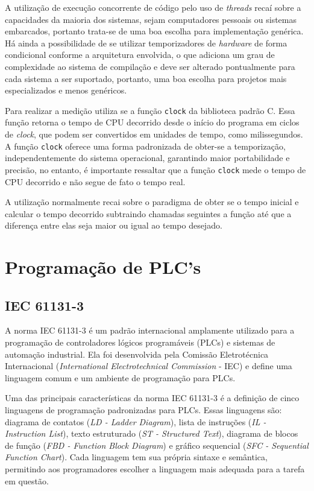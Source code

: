 A utilização de execução concorrente de código pelo uso de \textit{threads} recaí sobre a capacidades da maioria dos sistemas, sejam computadores pessoais ou sistemas embarcados, portanto trata-se de uma boa escolha para implementação genérica. Há ainda a possibilidade de se utilizar temporizadores de \textit{hardware} de forma condicional conforme a arquitetura envolvida, o que adiciona um grau de complexidade ao sistema de compilação e deve ser alterado pontualmente para cada sistema a ser suportado, portanto, uma boa escolha para projetos mais especializados e menos genéricos.

Para realizar a medição utiliza se a função \lstinline{clock} da biblioteca padrão C. Essa função retorna o tempo de CPU decorrido desde o início do programa em ciclos de \textit{clock}, que podem ser convertidos em unidades de tempo, como milissegundos. A função \lstinline{clock} oferece uma forma padronizada de obter-se a temporização, independentemente do sistema operacional, garantindo maior portabilidade e precisão, no entanto, é importante ressaltar que a função \lstinline{clock} mede o tempo de CPU decorrido e não segue de fato o tempo real.

A utilização normalmente recai sobre o paradigma de obter se o tempo inicial e calcular o tempo decorrido subtraindo chamadas seguintes a função até que a diferença entre elas seja maior ou igual ao tempo desejado. 



\section{Programação de PLC's}

\subsection{IEC 61131-3}

A norma IEC 61131-3 \cite{IEC611313} é um padrão internacional amplamente utilizado para a programação de controladores lógicos programáveis (PLCs) e sistemas de automação industrial. Ela foi desenvolvida pela Comissão Eletrotécnica Internacional (\textit{International Electrotechnical Commission} - IEC) e define uma linguagem comum e um ambiente de programação para PLCs.

Uma das principais características da norma IEC 61131-3 é a definição de cinco linguagens de programação padronizadas para PLCs. Essas linguagens são: diagrama de contatos (\textit{LD - Ladder Diagram}), lista de instruções (\textit{IL - Instruction List}), texto estruturado (\textit{ST - Structured Text}), diagrama de blocos de função (\textit{FBD - Function Block Diagram}) e gráfico sequencial (\textit{SFC - Sequential Function Chart}). Cada linguagem tem sua própria sintaxe e semântica, permitindo aos programadores escolher a linguagem mais adequada para a tarefa em questão.

